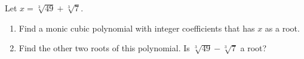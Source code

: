 Let $x=\sqrt[3]{49}+\sqrt[3]{7}$.
\begin{enumerate}
\item[(a)] Find a monic cubic polynomial with integer coefficients that has $x$ as a root.
\item[(b)] Find the other two roots of this polynomial. Is $\sqrt[3]{49}-\sqrt[3]{7}$ a root?
\end{enumerate}
